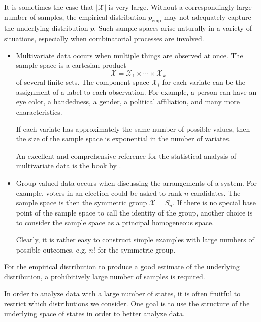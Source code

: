 \documentclass[cclicense]{hmcthesis}
\providecommand*{\xs}{\mathcal X}
\newcommand*{\emp}{\mathrm{emp}}
\numberwithin{equation}{chapter}
\numberwithin{thmcounter}{chapter}
\begin{document}
    It is sometimes the case that $|\xs|$ is very large.  Without a
    correspondingly large number of samples, the empirical distribution $p_\emp$
    may not adequately capture the underlying distribution $p$.  Such sample
    spaces arise naturally in a variety of situations, especially when
    combinatorial processes are involved.
    \begin{itemize}
    \item Multivariate data occurs when multiple things are observed at once.
    The sample space is a cartesian product
    \[
        \xs = \xs_1 \times \cdots \times \xs_k
    \]
    of several finite sets.  The component space $\xs_i$ for each variate can be
    the assignment of a label to each observation.  For example, a person can
    have an eye color, a handedness, a gender, a political affiliation, and many
    more characteristics.
    
    If each variate has approximately the same number of possible values, then
    the size of the sample space is exponential in the number of variates.  

    An excellent and comprehensive reference for the statistical analysis of
    multivariate data is the book by \citet{DMA}.

    \item Group-valued data occurs when discussing the arrangements of a system.
    For example, voters in an election could be asked to rank $n$ candidates.
    The sample space is then the symmetric group $\xs = S_n$.  If there is no
    special base point of the sample space to call the identity of the group,
    another choice is to consider the sample space as a principal homogeneous
    space.

    Clearly, it is rather easy to construct simple examples with large numbers
    of possible outcomes, e.g. $n!$ for the symmetric group.
    \end{itemize}
    For the empirical distribution to produce a good estimate of the underlying
    distribution, a prohibitively large number of samples is required.

    In order to analyze data with a large number of states, it is often fruitful
    to restrict which distributions we consider.  One goal is to use the
    structure of the underlying space of states in order to better analyze data.
\end{document}
